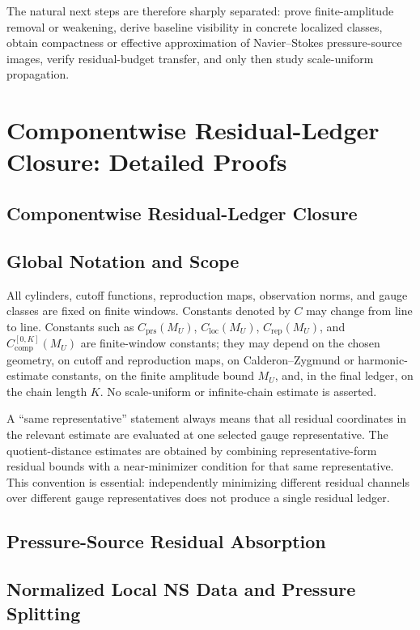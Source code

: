 \documentclass[11pt]{article}
\numberwithin{equation}{section}
\theoremstyle{definition}
\theoremstyle{remark}
\newcommand{\loc}{\mathrm{loc}}
\newcommand{\prs}{\mathrm{prs}}
\newcommand{\rep}{\mathrm{rep}}
\newcommand{\comp}{\mathrm{comp}}
\begin{document}
The natural next steps are therefore sharply separated: prove finite-amplitude
removal or weakening, derive baseline visibility in concrete localized
classes, obtain compactness or effective approximation of Navier--Stokes
pressure-source images, verify residual-budget transfer, and only then study
scale-uniform propagation.

\section{Componentwise Residual-Ledger Closure: Detailed Proofs}\label{app:residual-ledger-details}
\subsection*{Componentwise Residual-Ledger Closure}
\label{part:residual-ledger}

\subsection{Global Notation and Scope}

All cylinders, cutoff functions, reproduction maps, observation norms, and gauge classes are fixed on finite windows.  Constants denoted by \(C\) may change from line to line.  Constants such as \(C_{\prs}(M_U)\), \(C_{\loc}(M_U)\), \(C_{\rep}(M_U)\), and \(C_{\comp}^{[0,K]}(M_U)\) are finite-window constants; they may depend on the chosen geometry, on cutoff and reproduction maps, on Calderon--Zygmund or harmonic-estimate constants, on the finite amplitude bound \(M_U\), and, in the final ledger, on the chain length \(K\).  No scale-uniform or infinite-chain estimate is asserted.

A ``same representative'' statement always means that all residual coordinates in the relevant estimate are evaluated at one selected gauge representative.  The quotient-distance estimates are obtained by combining representative-form residual bounds with a near-minimizer condition for that same representative.  This convention is essential: independently minimizing different residual channels over different gauge representatives does not produce a single residual ledger.

\subsection*{Pressure-Source Residual Absorption}

\subsection{Normalized Local NS Data and Pressure Splitting}
\label{ps:sec:local-geometry}
\end{document}
